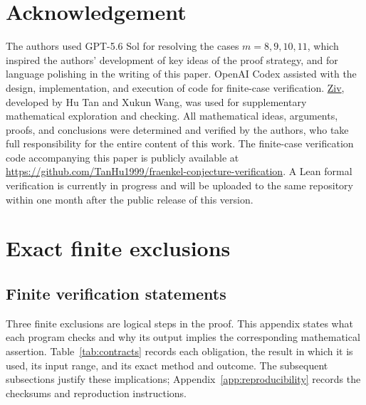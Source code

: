 \documentclass[11pt]{article}
\theoremstyle{definition}
\theoremstyle{remark}
\begin{document}
\section{Acknowledgement}

The authors used GPT-5.6 Sol for resolving the cases \(m=8,9,10,11\), 
which inspired the authors' development of key ideas of the proof strategy, 
and for language polishing in the writing of this paper. 
OpenAI Codex assisted with the design, implementation, and execution of code for finite-case verification. 
\href{https://ziv.ink}{Ziv}, developed by Hu Tan and Xukun Wang, 
was used for supplementary mathematical exploration and checking. 
All mathematical ideas, arguments, proofs, and conclusions were determined and verified by the authors, 
who take full responsibility for the entire content of this work. The finite-case verification code accompanying this paper is publicly available at \url{https://github.com/TanHu1999/fraenkel-conjecture-verification}. A Lean formal verification is currently in progress and will be uploaded to the same repository within one month after the public release of this version.



\appendix

\section{Exact finite exclusions}\label{app:verification}

\subsection{Finite verification statements}

Three finite exclusions are logical steps in the proof.  This appendix states
what each program checks and why its output implies the corresponding
mathematical assertion.  Table~\ref{tab:contracts} records each obligation,
the result in which it is used, its input range, and its exact method and
outcome.  The subsequent subsections justify these implications;
Appendix~\ref{app:reproducibility} records the checksums and reproduction
instructions.
\end{document}
